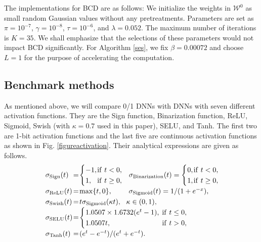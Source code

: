 \documentclass[journal]{IEEEtran}
\def\CW{{\boldsymbol{\mathcal W}}}
\begin{document}
 




The implementations for BCD are as follows: We initialize the weights in $\CW^0$ as small random Gaussian values without any pretreatments. Parameters are set as $\pi = 10^{-7}$, $\gamma = 10^{-8}$, $\tau = 10^{-6}$, and $\lambda=0.052$. The maximum number of iterations is $K=35.$ We shall emphasize that the selections of these parameters would not impact BCD significantly.  For Algorithm \ref{ses}, we fix $\beta=0.00072$ and choose $L=1$ for the purpose of accelerating the computation.




\subsection{Benchmark methods}
As mentioned above, we will compare 0/1 DNNs with DNNs with seven different activation functions. They are the Sign function, Binarization function, ReLU,   Sigmoid, Swish (with $\kappa=0.7$ used in this paper), SELU, and Tanh. The first two are 1-bit activation functions and the last five are continuous activation functions as shown in Fig. \ref{figureactivation}. Their analytical expressions are given as follows.
\begin{eqnarray*}
 \arraycolsep=0.5pt\def\arraystretch{1.25}
~\begin{array}{lll}
\sigma_{\rm Sign}(t)& =&  \left\{
\begin{array}{ll}
-1 ,& {\rm if~} t<0,\\
1, & {\rm if~} t\geq 0,
\end{array}\right.~~
\sigma_{\rm Binarization}(t) =  \left\{
\begin{array}{ll}
0 ,& {\rm if~} t<0,\\
1, & {\rm if~} t\geq 0,
\end{array}\right.\\
 \sigma_{\rm ReLU}(t) &=& \max\{t,0\},\qquad~
 \sigma_{\rm Sigmoid}(t) =  {1}/({1+e^{-x}}),\\
 \sigma_{\rm Swish}(t) &=& t \sigma_{\rm Sigmoid}(\kappa t), ~~\kappa\in(0,1),\\
\sigma_{\rm SELU}(t) &=& \left\{
\begin{array}{ll}
1.0507 \times 1.6732  (e^t-1),~& {\rm if~} t\leq0,\\
1.0507 t, & {\rm if~} t>0,
\end{array}\right.\\
 \sigma_{\rm Tanh}(t) &= &(e^{t}-e^{-t})/(e^{t}+e^{-t}). 
\end{array}
\end{eqnarray*}
\end{document}
